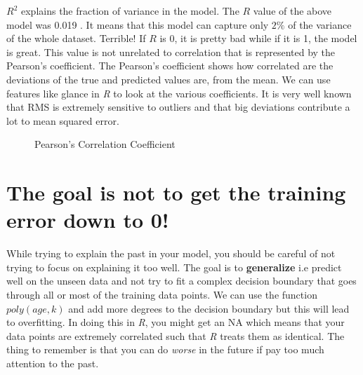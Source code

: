 \documentclass{article}
\begin{document}
$R^2$ explains the fraction of variance in the model. The $R$ value of the above model was 0.019 . It means that this model can capture only $2\%$ of the variance of the whole dataset. Terrible! If $R$ is 0, it is pretty bad while if it is 1, the model is great. This value is not unrelated to correlation that is represented by the Pearson's coefficient. The Pearson's coefficient shows how correlated are the deviations of the true and predicted values are, from the mean. We can use features like glance in \emph{R}
to look at the various coefficients. It is very well known that RMS is extremely sensitive to outliers and that big deviations contribute a lot to mean squared error. 

\begin{figure}[h]
\centering
\caption{Pearson's Correlation Coefficient}
{\setlength{\fboxsep}{20pt}
\setlength{\fboxrule}{1pt}
\textcolor{Magenta}{}
}
\end{figure} 

\newpage
\section{The goal is not to get the training error down to 0!}
While trying to explain the past in your model, you should be careful of not trying to focus on explaining it too well. The goal is to \textbf{generalize} i.e predict well on the unseen data and not try to fit a complex decision boundary that goes through all or most of the training data points. We can use the function $poly(age,k)$ and add more degrees to the decision boundary but this will lead to overfitting. In doing this in \emph{R}, you might get an NA which means that your data points are extremely correlated such that \emph{R} treats them as identical. The thing to remember is that you can do \emph{worse} in the future if pay too much attention to the past.
\end{document}
